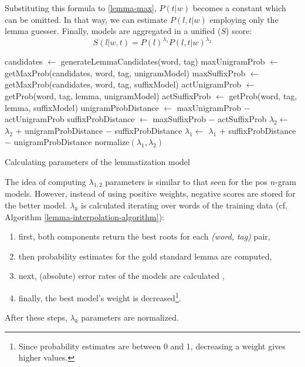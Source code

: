 Substituting this formula to \eqref{lemma-max}, $P(t|w)$ becomes a constant which can be omitted. 
In that way, we can estimate $P(l,t|w)$ employing only the lemma guesser. 
Finally, models are aggregated in a unified ($S$) score: 
\begin{equation}\label{lemma-interpolated}
S(l|w,t) = P(l)^{\lambda_1} P(l,t|w)^{\lambda_2}
\end{equation}


\begin{algorithm*}
\begin{algorithmic}[H]
        \State candidates $\gets$ generateLemmaCandidates(word, tag)
        \State maxUnigramProb $\gets$ getMaxProb(candidates, word, tag, unigramModel)
        \State maxSuffixProb $\gets$ getMaxProb(candidates, word, tag, suffixModel)
        \State actUnigramProb $\gets$ getProb(word, tag, lemma, unigramModel)
        \State actSuffixProb $\gets$ getProb(word, tag, lemma, suffixModel)
        \State unigramProbDistance $\gets$ maxUnigramProb $-$ actUnigramProb
        \State suffixProbDistance $\gets$ maxSuffixProb $-$ actSuffixProb
            \State $\lambda_{2} \gets$ $\lambda_{2}$ $+$ unigramProbDistance $-$ suffixProbDistance
        \Else%
            \State $\lambda_{1} \gets$ $\lambda_{1}$ $+$ suffixProbDistance $-$ unigramProbDistance
        \EndIf
    \EndFor
    \State normalize$( \lambda_{1}, \lambda_{2} )$
  \end{algorithmic}
  \caption{Calculating parameters of the lemmatization model}
\label{lemma-interpolation-algorithm}
\end{algorithm*}

The idea of computing $\lambda_{1,2}$ parameters is similar to that seen for the \gls{pos} $n$-gram models. 
However, instead of using positive weights, negative scores are stored for the better model.  
$\lambda_{k}$ is calculated iterating over words of the training data (cf. Algorithm \ref{lemma-interpolation-algorithm}):
\begin{enumerate}
  \item first, both components return the best roots for each \emph{(word, tag)} pair, 
  \item then probability estimates for the gold standard lemma are computed,
  \item next, (absolute) error rates of the models are calculated ,
  \item finally, the best model’s weight is decreased\footnote{Since probability estimates are between 0 and 1, decreasing a weight gives higher values.}.
\end{enumerate}
After these steps, $\lambda_k$ parameters are normalized.



